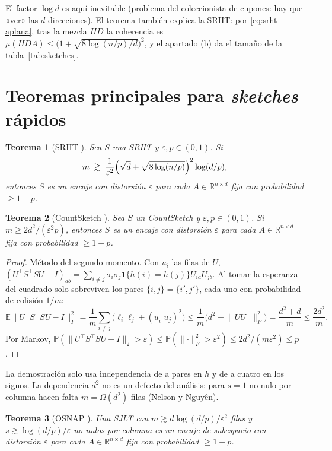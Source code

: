 \documentclass[11pt,a4paper,oneside]{book}
\newtheorem{teorema}{Teorema}[chapter]
\theoremstyle{definition}
\theoremstyle{remark}
\newcommand{\R}{\mathbb{R}}
\newcommand{\E}{\mathbb{E}}
\newcommand{\Prob}{\mathbb{P}}
\newcommand{\T}{^{\top}}
\newcommand{\eps}{\varepsilon}
\newcommand{\nrm}[1]{\lVert #1\rVert}
\begin{document}
El factor $\log d$ es aquí inevitable (problema del coleccionista de cupones: hay que «ver» las $d$
direcciones). El teorema también explica la SRHT: por \eqref{eq:srht-aplana}, tras la mezcla $HD$ la
coherencia es $\mu(HDA)\le\bigl(1+\sqrt{8\log(n/p)/d}\bigr)^2$, y el apartado (b) da el tamaño de la tabla~\ref{tab:sketches}.

\section{Teoremas principales para \emph{sketches} rápidos}

\begin{teorema}[SRHT {\cite{Tropp11,BG13}}]\label{teo:srht}
Sea $S$ una SRHT y $\eps,p\in(0,1)$. Si
\[ m\;\gtrsim\;\frac{1}{\eps^2}\Bigl(\sqrt d+\sqrt{8\log(n/p)}\Bigr)^{2}\log(d/p), \]
entonces $S$ es un encaje con distorsión $\eps$ para cada $A\in\R^{n\times d}$ fija con probabilidad $\ge1-p$.
\end{teorema}

\begin{teorema}[CountSketch {\cite{CW13,NN13,MM13}}]\label{teo:count}
Sea $S$ un CountSketch y $\eps,p\in(0,1)$. Si $m\ge2d^2/(\eps^2p)$, entonces $S$ es un encaje con distorsión
$\eps$ para cada $A\in\R^{n\times d}$ fija con probabilidad $\ge1-p$.
\end{teorema}

\begin{proof}
Método del segundo momento. Con $u_i$ las filas de $U$,
$(U\T S\T SU-I)_{ab}=\sum_{i\ne j}\sigma_i\sigma_j\mathbf 1\{h(i)=h(j)\}U_{ia}U_{jb}$. Al tomar la esperanza del
cuadrado solo sobreviven los pares $\{i,j\}=\{i',j'\}$, cada uno con probabilidad de colisión $1/m$:
\[ \E\nrm{U\T S\T SU-I}_F^2=\frac1m\sum_{i\ne j}\bigl(\ell_i\ell_j+(u_i\T u_j)^2\bigr)\le\frac1m\bigl(d^2+\nrm{UU\T}_F^2\bigr)=\frac{d^2+d}{m}\le\frac{2d^2}{m}. \]
Por Markov, $\Prob(\nrm{U\T S\T SU-I}_2>\eps)\le\Prob(\nrm{\cdot}_F^2>\eps^2)\le2d^2/(m\eps^2)\le p$.
\end{proof}

La demostración solo usa independencia de a pares en $h$ y de a cuatro en los signos. La dependencia $d^2$ no
es un defecto del análisis: para $s=1$ no nulo por columna hacen falta $m=\Omega(d^2)$ filas (Nelson y Nguyên).

\begin{teorema}[OSNAP {\cite{NN13,Cohen16}}]\label{teo:osnap}
Una SJLT con $m\gtrsim d\log(d/p)/\eps^2$ filas y $s\gtrsim\log(d/p)/\eps$ no nulos por columna es un encaje de
subespacio con distorsión $\eps$ para cada $A\in\R^{n\times d}$ fija con probabilidad $\ge1-p$.
\end{teorema}
\end{document}

